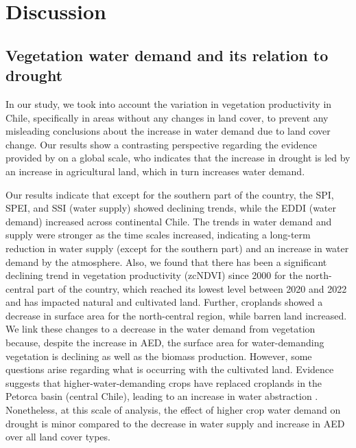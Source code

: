 \documentclass[
  authoryear,
  preprint,
  3p,
  onecolumn]{elsarticle}
\begin{document}
\hypertarget{discussion}{%
\section{Discussion}\label{discussion}}

\hypertarget{vegetation-water-demand-and-its-relation-to-drought}{%
\subsection{Vegetation water demand and its relation to
drought}\label{vegetation-water-demand-and-its-relation-to-drought}}

In our study, we took into account the variation in vegetation
productivity in Chile, specifically in areas without any changes in land
cover, to prevent any misleading conclusions about the increase in water
demand due to land cover change. Our results show a contrasting
perspective regarding the evidence provided by
\citet{Vicente-Serrano2022} on a global scale, who indicates that the
increase in drought is led by an increase in agricultural land, which in
turn increases water demand.

Our results indicate that except for the southern part of the country,
the SPI, SPEI, and SSI (water supply) showed declining trends, while the
EDDI (water demand) increased across continental Chile. The trends in
water demand and supply were stronger as the time scales increased,
indicating a long-term reduction in water supply (except for the
southern part) and an increase in water demand by the atmosphere. Also,
we found that there has been a significant declining trend in vegetation
productivity (zcNDVI) since 2000 for the north-central part of the
country, which reached its lowest level between 2020 and 2022 and has
impacted natural and cultivated land. Further, croplands showed a
decrease in surface area for the north-central region, while barren land
increased. We link these changes to a decrease in the water demand from
vegetation because, despite the increase in AED, the surface area for
water-demanding vegetation is declining as well as the biomass
production. However, some questions arise regarding what is occurring
with the cultivated land. Evidence suggests that higher-water-demanding
crops have replaced croplands in the Petorca basin (central Chile),
leading to an increase in water abstraction
\citep{Munoz2020, Duran2020}. Nonetheless, at this scale of analysis,
the effect of higher crop water demand on drought is minor compared to
the decrease in water supply and increase in AED over all land cover
types.
\end{document}
